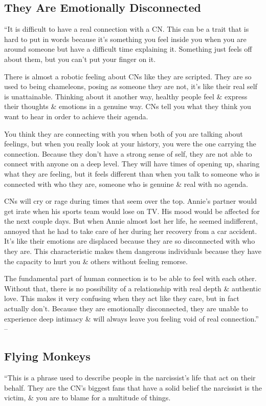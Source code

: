 \documentclass{article}
\numberwithin{equation}{section}
\begin{document}
\subsection{They Are Emotionally Disconnected}
``It is difficult to have a real connection with a CN. This can be a trait that is hard to put in words because it's something you feel inside you when you are around someone but have a difficult time explaining it. Something just feels off about them, but you can't put your finger on it.

There is almost a robotic feeling about CNs like they are scripted. They are so used to being chameleons, posing as someone they are not, it's like their real self is unattainable. Thinking about it another way, healthy people feel \& express their thoughts \& emotions in a genuine way. CNs tell you what they think you want to hear in order to achieve their agenda.

You think they are connecting with you when both of you are talking about feelings, but when you really look at your history, you were the one carrying the connection. Because they don't have a strong sense of self, they are not able to connect with anyone on a deep level. They will have times of opening up, sharing what they are feeling, but it feels different than when you talk to someone who is connected with who they are, someone who is genuine \& real with no agenda.

CNs will cry or rage during times that seem over the top. Annie's partner would get irate when his sports team would lose on TV. His mood would be affected for the next couple days. But when Annie almost lost her life, he seemed indifferent, annoyed that he had to take care of her during her recovery from a car accident. It's like their emotions are displaced because they are so disconnected with who they are. This characteristic makes them dangerous individuals because they have the capacity to hurt you \& others without feeling remorse.

The fundamental part of human connection is to be able to feel with each other. Without that, there is no possibility of a relationship with real depth \& authentic love. This makes it very confusing when they act like they care, but in fact actually don't. Because they are emotionally disconnected, they are unable to experience deep intimacy \& will always leave you feeling void of real connection.'' -- \cite[pp. 59--60]{Mirza2017}

\subsection{Flying Monkeys}
``This is a phrase used to describe people in the narcissist's life that act on their behalf. They are the CN's biggest fans that have a solid belief the narcissist is the victim, \& you are to blame for a multitude of things.
\end{document}
